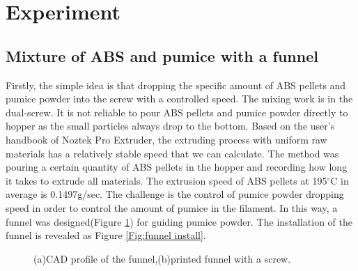 \section{Experiment}

\subsection{Mixture of ABS and pumice with a funnel}
Firstly, the simple idea is that dropping the specific amount of ABS pellets and pumice powder into the screw with a controlled speed. The mixing work is in the dual-screw. It is not reliable to pour ABS pellets and pumice powder directly to hopper as the small particles always drop to the bottom. Based on the user's handbook of Noztek Pro Extruder, the extruding process with uniform raw materials has a relatively stable speed that we can calculate. The method was pouring a certain quantity of ABS pellets in the hopper and recording how long it takes to extrude all materials. The extrusion speed of ABS pellets at 195$^{\circ}$C in average is 0.1497g/sec. The challenge is the control of pumice powder dropping speed in order to control the amount of pumice in the filament. In this way, a funnel was designed(Figure \ref{Fig:funnel}) for guiding pumice powder. The installation of the funnel is revealed as Figure \ref{Fig:funnel install}.\\
\begin{figure}[htbp] %
	\centering
  \caption[The designed funnel]{\footnotesize (a)CAD profile of the funnel,(b)printed funnel with a screw.}
  \label{Fig:funnel}
\end{figure}
